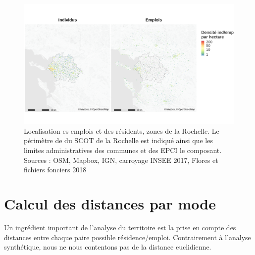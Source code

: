 \documentclass[
  10pt,
  a4paper,
  numbers=noendperiod,
  DIV=9]{scrreprt}
\begin{document}
\begin{figure}[htb]

{\centering \includegraphics[width=1\textwidth,height=\textheight]{./output/popemp.png}

}

\caption[Localisation des résidents et des
emplois]{\label{fig-zoneslr}Localisation es emplois et des résidents,
zones de la Rochelle. Le périmètre de du SCOT de la Rochelle est indiqué
ainsi que les limites administratives des communes et des EPCI le
composant. Sources : OSM, Mapbox, IGN, carroyage INSEE 2017, Flores et
fichiers fonciers 2018}

\end{figure}

\hypertarget{sec-distancesparmode}{%
\section{Calcul des distances par mode}\label{sec-distancesparmode}}

Un ingrédient important de l'analyse du territoire est la prise en
compte des distances entre chaque paire possible résidence/emploi.
Contrairement à l'analyse synthétique, nous ne nous contentons pas de la
distance euclidienne.
\end{document}
